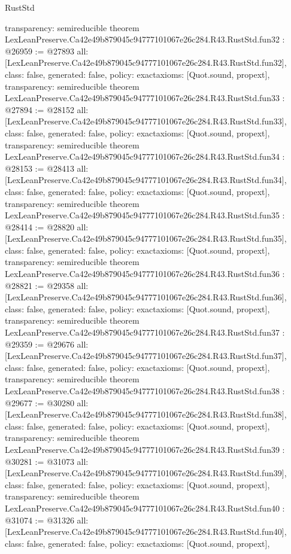 \begin{lexlean}{RustStd}
\begin{coremodule}
{  transparency: semireducible
}
theorem LexLeanPreserve.Ca42e49b879045c94777101067e26c284.R43.RustStd.fun32 : @26959 := @27893 {
  all: [LexLeanPreserve.Ca42e49b879045c94777101067e26c284.R43.RustStd.fun32],
  class: false,
  generated: false,
  policy: exact{axioms: [Quot.sound, propext]},
  transparency: semireducible
}
theorem LexLeanPreserve.Ca42e49b879045c94777101067e26c284.R43.RustStd.fun33 : @27894 := @28152 {
  all: [LexLeanPreserve.Ca42e49b879045c94777101067e26c284.R43.RustStd.fun33],
  class: false,
  generated: false,
  policy: exact{axioms: [Quot.sound, propext]},
  transparency: semireducible
}
theorem LexLeanPreserve.Ca42e49b879045c94777101067e26c284.R43.RustStd.fun34 : @28153 := @28413 {
  all: [LexLeanPreserve.Ca42e49b879045c94777101067e26c284.R43.RustStd.fun34],
  class: false,
  generated: false,
  policy: exact{axioms: [Quot.sound, propext]},
  transparency: semireducible
}
theorem LexLeanPreserve.Ca42e49b879045c94777101067e26c284.R43.RustStd.fun35 : @28414 := @28820 {
  all: [LexLeanPreserve.Ca42e49b879045c94777101067e26c284.R43.RustStd.fun35],
  class: false,
  generated: false,
  policy: exact{axioms: [Quot.sound, propext]},
  transparency: semireducible
}
theorem LexLeanPreserve.Ca42e49b879045c94777101067e26c284.R43.RustStd.fun36 : @28821 := @29358 {
  all: [LexLeanPreserve.Ca42e49b879045c94777101067e26c284.R43.RustStd.fun36],
  class: false,
  generated: false,
  policy: exact{axioms: [Quot.sound, propext]},
  transparency: semireducible
}
theorem LexLeanPreserve.Ca42e49b879045c94777101067e26c284.R43.RustStd.fun37 : @29359 := @29676 {
  all: [LexLeanPreserve.Ca42e49b879045c94777101067e26c284.R43.RustStd.fun37],
  class: false,
  generated: false,
  policy: exact{axioms: [Quot.sound, propext]},
  transparency: semireducible
}
theorem LexLeanPreserve.Ca42e49b879045c94777101067e26c284.R43.RustStd.fun38 : @29677 := @30280 {
  all: [LexLeanPreserve.Ca42e49b879045c94777101067e26c284.R43.RustStd.fun38],
  class: false,
  generated: false,
  policy: exact{axioms: [Quot.sound, propext]},
  transparency: semireducible
}
theorem LexLeanPreserve.Ca42e49b879045c94777101067e26c284.R43.RustStd.fun39 : @30281 := @31073 {
  all: [LexLeanPreserve.Ca42e49b879045c94777101067e26c284.R43.RustStd.fun39],
  class: false,
  generated: false,
  policy: exact{axioms: [Quot.sound, propext]},
  transparency: semireducible
}
theorem LexLeanPreserve.Ca42e49b879045c94777101067e26c284.R43.RustStd.fun40 : @31074 := @31326 {
  all: [LexLeanPreserve.Ca42e49b879045c94777101067e26c284.R43.RustStd.fun40],
  class: false,
  generated: false,
  policy: exact{axioms: [Quot.sound, propext]},
}
\end{coremodule}
\end{lexlean}
